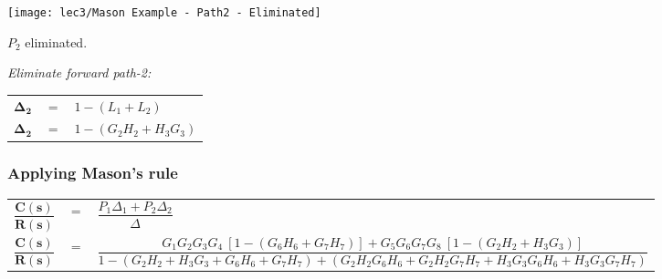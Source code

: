 \vspace{1cm}

\begin{marginfigure}
		\texttt{[image: lec3/Mason Example - Path2 - Eliminated]}
		\caption{$P_2$ eliminated.}
\end{marginfigure}

\textit{Eliminate forward path-2:}\\[+1em]
\begin{tabular}{l l l}
		$\boldsymbol{\Delta_2}$ & $=$ & $1-(L_1+L_2)$\\[+1em]
		$\boldsymbol{\Delta_2}$ & $=$ & $1-(G_2H_2+H_3G_3)$\\
\end{tabular}


\subsubsection{Applying Mason's rule}
\begin{tabular}{l l l}
		$\dfrac{\boldsymbol{C(s)}}{\boldsymbol{R(s)}}$ & $=$ & $\dfrac{P_1\Delta_1+P_2\Delta_2}{\Delta}$\\[+1em]
		$\dfrac{\boldsymbol{C(s)}}{\boldsymbol{R(s)}}$ & $=$ & $\dfrac{G_1G_2G_3G_4\ [1-(G_6H_6+G_7H_7)]+G_5G_6G_7G_8\ [1-(G_2H_2+H_3G_3)]}{1-(G_2H_2+H_3G_3+G_6H_6+G_7H_7)+(G_2H_2G_6H_6+G_2H_2G_7H_7+H_3G_3G_6H_6+H_3G_3G_7H_7)}$\\
\end{tabular}